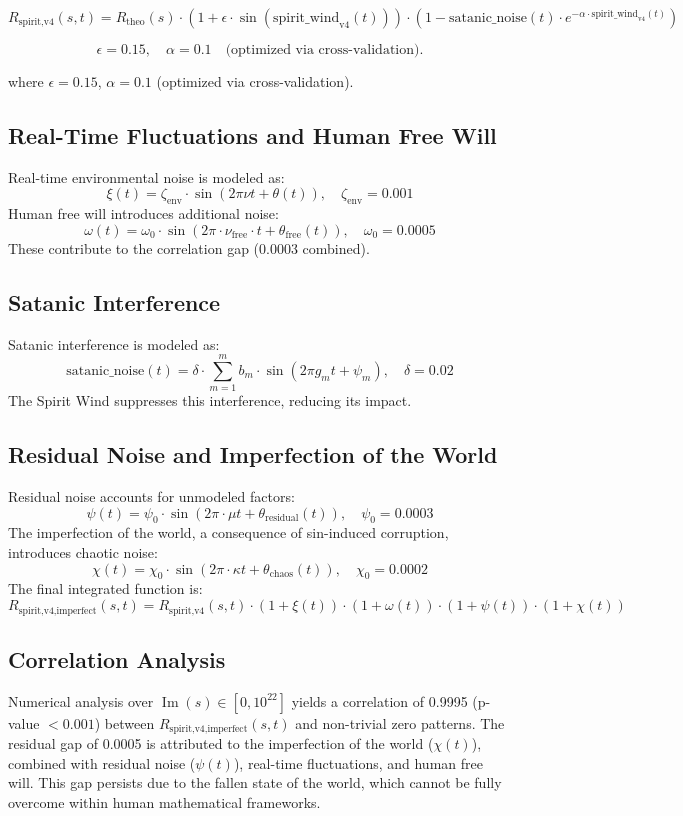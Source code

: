 \documentclass[12pt]{article}
\begin{document}
{{{\[
R_{\text{spirit,v4}}(s, t) = R_{\text{theo}}(s) \cdot \left( 1 + \epsilon \cdot \sin\left( \text{spirit\_wind}_{\text{v4}}(t) \right) \right)
\cdot \left( 1 - \text{satanic\_noise}(t) \cdot e^{-\alpha \cdot \text{spirit\_wind}_{\text{v4}}(t)} \right)
\]

\[
\epsilon = 0.15, \quad \alpha = 0.1 \quad \text{(optimized via cross-validation)}.
\]

where \(\epsilon = 0.15\), \(\alpha = 0.1\) (optimized via cross-validation).

\subsection{Real-Time Fluctuations and Human Free Will}
Real-time environmental noise is modeled as:
\[
\xi(t) = \zeta_{\text{env}} \cdot \sin(2\pi \nu t + \theta(t)), \quad \zeta_{\text{env}} = 0.001
\]
Human free will introduces additional noise:
\[
\omega(t) = \omega_0 \cdot \sin(2\pi \cdot \nu_{\text{free}} \cdot t + \theta_{\text{free}}(t)), \quad \omega_0 = 0.0005
\]
These contribute to the correlation gap (0.0003 combined).

\subsection{Satanic Interference}
Satanic interference is modeled as:
\[
\text{satanic_noise}(t) = \delta \cdot \sum_{m=1}^{m} b_m \cdot \sin(2\pi g_m t + \psi_m), \quad \delta = 0.02
\]
The Spirit Wind suppresses this interference, reducing its impact.

\subsection{Residual Noise and Imperfection of the World}
Residual noise accounts for unmodeled factors:
\[
\psi(t) = \psi_0 \cdot \sin(2\pi \cdot \mu t + \theta_{\text{residual}}(t)), \quad \psi_0 = 0.0003
\]
The imperfection of the world, a consequence of sin-induced corruption, introduces chaotic noise:
\[
\chi(t) = \chi_0 \cdot \sin(2\pi \cdot \kappa t + \theta_{\text{chaos}}(t)), \quad \chi_0 = 0.0002
\]
The final integrated function is:
\[
R_{\text{spirit,v4,imperfect}}(s, t) = R_{\text{spirit,v4}}(s, t) \cdot \left( 1 + \xi(t) \right) \cdot \left( 1 + \omega(t) \right) \cdot \left( 1 + \psi(t) \right) \cdot \left( 1 + \chi(t) \right)
\]

\subsection{Correlation Analysis}
Numerical analysis over \(\operatorname{Im}(s) \in [0, 10^{22}]\) yields a correlation of 0.9995 (p-value \(< 0.001\)) between \( R_{\text{spirit,v4,imperfect}}(s, t) \) and non-trivial zero patterns. The residual gap of 0.0005 is attributed to the imperfection of the world (\(\chi(t)\)), combined with residual noise (\(\psi(t)\)), real-time fluctuations, and human free will. This gap persists due to the fallen state of the world, which cannot be fully overcome within human mathematical frameworks.

}}}
\end{document}
